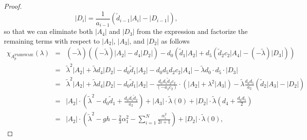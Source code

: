 \documentclass[a4paper, 11pt]{article}
\begin{document}
\begin{proof}
    \begin{equation*}
        \left|D_{i}\right| = \frac{1}{a_{i-1}}\left( \widetilde{d}_{{i-1}} \left|A_i\right| - \left|D_{i-1}\right| \right),
    \end{equation*}
    so that we can eliminate both $\left|A_4\right|$ and $\left|D_3\right|$ from the expression and factorize the remaining terms with respect to $\left|A_2\right|$, $\left|A_3\right|$, and $\left|D_2\right|$ as follows
    \begin{eqnarray*}
       \chi_{A^{\textrm{PMHSWME}}_{p}}(\lambda) &=&(-\widetilde{\lambda}) \left((-\widetilde{\lambda}) \left|A_2\right|-d_4\left|D_2\right|\right)-d_0  \left(\widetilde{d}_{1}\left|A_2\right|+d_5 \left(\widetilde{d}_2 c_2\left|A_4\right|-(-\widetilde{\lambda}) \left|D_3\right|\right)\right) \\
       &=& \widetilde{\lambda}^2\left|A_2\right|+\widetilde{\lambda} d_4\left|D_2\right|-d_0 \widetilde{d}_{1}\left|A_2\right|-d_0 d_5 d_2 c_2\left|A_4\right|-\widetilde{\lambda} d_0 \cdot d_5 \cdot\left|D_3\right| \\
       &=& \widetilde{\lambda}^2\left|A_2\right|+\widetilde{\lambda} d_4\left|D_2\right|-d_0 \widetilde{d}_{1}\left|A_2\right|-\frac{d_0 d_5 \widetilde{d}_2 c_2}{\left(-a_2 c_2\right)} \cdot\left(\left|A_2\right|+\lambda^2\left|A_3\right|\right)-\widetilde{\lambda} \frac{d_0 d_5}{a_2}\left(\widetilde{d}_2\left|A_3\right|-\left|D_2\right|\right) \\
        &=& \left|A_2\right| \cdot\left(\widetilde{\lambda}^2-d_0 \widetilde{d}_{1}+\frac{d_0 d_5\widetilde{d}_2}{a_2}\right) + |A_3| \cdot \widetilde{\lambda} \left(0\right) +\left|D_2\right| \cdot  \widetilde{\lambda}\left(d_4+\frac{d_0 d_5}{2}\right) \\
        &=& \left|A_2\right| \cdot\left(\widetilde{\lambda}^2 - gh - \frac{2}{3}\alpha_1^2 - \sum\limits_{i=1}^N\frac{\alpha_i^2}{2i+1}\right) +\left|D_2\right| \cdot  \widetilde{\lambda}\left( 0 \right),
    \end{eqnarray*}

\end{proof}
\end{document}
